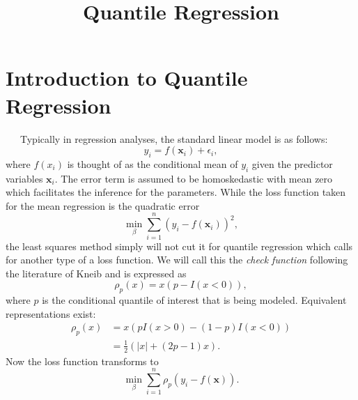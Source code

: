 \documentclass[12pt]{article}
\begin{document}
\title{Quantile Regression}

\section{Introduction to Quantile Regression}
\vspace{0.3cm}
\ \ \ Typically in regression analyses, the standard linear model is as follows:
\begin{equation}
  y_{i} = f\left(\mathbf{x}_{i}\right) + \epsilon_{i},
\end{equation}
where $f\left(x_{i}\right)$ is thought of as the conditional mean of $y_{i}$ given the predictor variables $\mathbf{x}_{i}$. The error term is assumed to be homoskedastic with mean zero which facilitates the inference for the parameters. While the loss function taken for the mean regression is the quadratic error
\begin{equation}
  \min_{\beta} \sum_{i=1}^{n}\left(y_{i}-f\left(\mathbf{x}_{i}\right)\right)^{2},
\end{equation}
the least squares method simply will not cut it for quantile regression which calls for another type of a loss function. We will call this the \emph{check function} following the literature of Kneib and is expressed as
\begin{equation}
  \rho_{p}\left(x\right) = x\left(p-I\left(x < 0\right)\right),
\end{equation}
where $p$ is the conditional quantile of interest that is being modeled.
Equivalent representations exist:
\begin{align*}
  \rho_{p}\left(x\right) &= x\left(pI\left(x > 0\right) - \left(1-p\right)I\left(x<0\right)\right)\\
  &= \frac{1}{2}\left(\left|x\right| +\left(2p-1\right)x\right).
\end{align*}
Now the loss function transforms to
\begin{equation}
  \min_{\beta}\sum_{i=1}^{n}\rho_{p}\left(y_{i}-f\left(\mathbf{x}\right)\right).
\end{equation}
\end{document}
